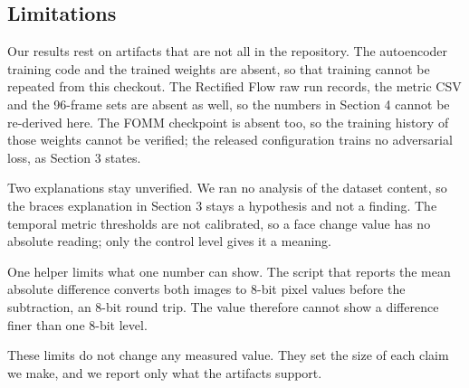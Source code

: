 \subsection{Limitations}
Our results rest on artifacts that are not all in the repository. The
autoencoder training code and the trained weights are absent, so that training
cannot be repeated from this checkout. The Rectified Flow raw run records, the
metric CSV and the 96-frame sets are absent as well, so the numbers in
Section 4 cannot be re-derived here. The FOMM checkpoint is absent too, so the
training history of those weights cannot be verified; the released
configuration trains no adversarial loss, as Section 3 states.

Two explanations stay unverified. We ran no analysis of the dataset content, so
the braces explanation in Section 3 stays a hypothesis and not a finding. The
temporal metric thresholds are not calibrated, so a face change value has no
absolute reading; only the control level gives it a meaning.

One helper limits what one number can show. The script that reports the mean
absolute difference converts both images to 8-bit pixel values before the
subtraction, an 8-bit round trip. The value therefore cannot show a difference
finer than one 8-bit level.

These limits do not change any measured value. They set the size of each claim
we make, and we report only what the artifacts support.
